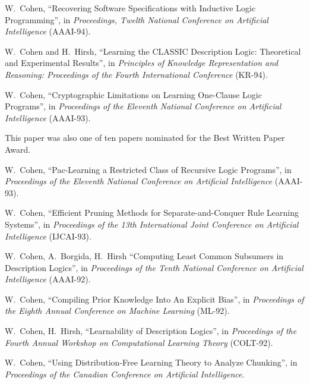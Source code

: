 \item[1994] W.~Cohen, ``Recovering Software Specifications with 
		Inductive Logic Programming'',
		in {\em Proceedings, Twelth National Conference on
		Artificial Intelligence} (AAAI-94).

\item[1994] W.~Cohen and H.~Hirsh, ``Learning the CLASSIC Description 
		Logic: Theoretical and Experimental Results'', 
		in {\em Principles of Knowledge Representation and
		Reasoning: Proceedings of the Fourth International
		Conference\/}  (KR-94).

\item[1993] W.~Cohen, ``Cryptographic Limitations
		on Learning One-Clause Logic Programs'', 
		in {\em Proceedings of the Eleventh National Conference
		on Artificial Intelligence} (AAAI-93).

		This paper was also one of ten papers 
		nominated for the Best Written Paper Award.

\item[1993] W.~Cohen, ``Pac-Learning a Restricted Class of
		Recursive Logic Programs'', 
		in {\em Proceedings of the Eleventh National Conference
		on Artificial Intelligence} (AAAI-93).   

\item[1993] W.~Cohen, ``Efficient Pruning Methods for
		 Separate-and-Conquer Rule Learning Systems'',
		in {\em Proceedings of the 13th International
		Joint Conference on Artificial Intelligence} (IJCAI-93).

\item[1992] 	W.~Cohen, A.~Borgida, H.~Hirsh ``Computing Least
		Common Subsumers in  Description Logics'', in {\em
		Proceedings of the Tenth National Conference on
		Artificial Intelligence} (AAAI-92).  

\item[1992] 	W.~Cohen, ``Compiling Prior Knowledge Into An Explicit
		Bias'', in {\em Proceedings of the Eighth Annual
		Conference on Machine Learning} (ML-92). 

\item[1992] 	W.~Cohen, H.~Hirsh, ``Learnability of Description Logics'',
		in {\em Proceedings of the Fourth Annual Workshop
		on Computational Learning Theory} (COLT-92).

\item[1990]	W.~Cohen, ``Using Distribution-Free Learning Theory to
		Analyze Chunking'', in {\em Proceedings of the
		Canadian Conference on Artificial Intelligence}.

